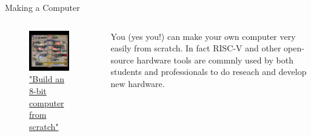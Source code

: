 \documentclass[aspectratio=169]{beamer}
\begin{document}
\begin{frame}{Making a Computer}
    
    \begin{columns}
        \begin{column}{0.5\textwidth}
            \begin{figure}
                \centering
                \includegraphics[width=0.9\textwidth]{imgs/vis_7.png}
                \\
                \href{https://eater.net/8bit}{"Build an 8-bit computer from scratch"}
            \end{figure}
        \end{column}
        \begin{column}{0.5\textwidth}
            You (yes you!) can make your own computer very easily from scratch. In fact RISC-V and other open-source hardware tools are commnly used by both students and professionals to do reseach and develop new hardware.
        \end{column}
    \end{columns}

\end{frame}
\end{document}
